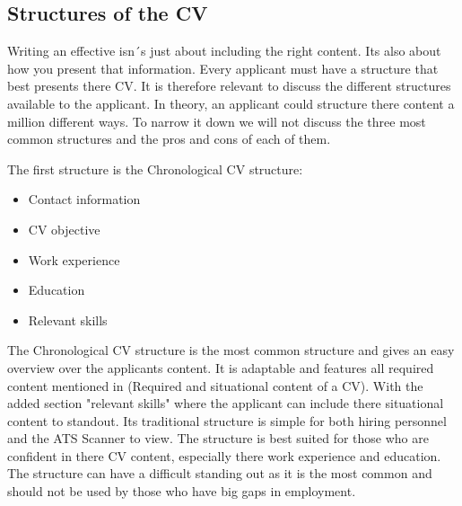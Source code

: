 \subsection{Structures of the CV}
Writing an effective isn´s just about including the right content. 
Its also about how you present that information.
Every applicant must have a structure that best presents there CV.
It is therefore relevant to discuss the different structures available to the applicant. 
In theory, an applicant could structure there content a million different ways.
To narrow it down we will not discuss the three most common structures and the pros and cons of each of them.

The first structure is the Chronological CV structure: \\
\begin{itemize}
   \item  Contact information
   \item  CV objective
   \item  Work experience
   \item  Education
   \item  Relevant skills
   \end{itemize}
The Chronological CV structure is the most common structure and gives an easy overview over the applicants content.
It is adaptable and features all required content mentioned in (Required and situational content of a CV).
With the added section "relevant skills" where the applicant can include there situational content to standout.
Its traditional structure is simple for both hiring personnel and the ATS Scanner to view.
The structure is best suited for those who are confident in there CV content, especially there work experience and education.
The structure can have a difficult standing out as it is the most common and should not be used by those who have big gaps in employment.\\

